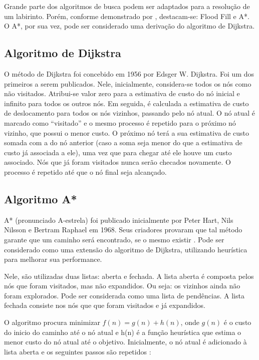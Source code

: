Grande parte dos algoritmos de busca podem ser adaptados para a resolução de um labirinto. Porém, conforme demonstrado por , destacam-se: Flood Fill e A*. O A*, por sua vez, pode ser considerado uma derivação do algoritmo de Dijkstra.

\subsection{Algoritmo de Dijkstra}
\label{ssec:algoritmo_dijkstra}
O método de Dijkstra foi concebido em 1956 por Edsger W. Dijkstra. Foi um dos primeiros a serem publicados. Nele, inicialmente, considera-se todos os nós como não visitados. Atribui-se valor zero para a estimativa de custo do nó inicial e infinito para todos os outros nós. Em seguida, é calculada a estimativa de custo de deslocamento para todos os nós vizinhos, passando pelo nó atual. O nó atual é marcado como “visitado” e o mesmo processo é repetido para o próximo nó vizinho, que possui o menor custo. O próximo nó terá a sua estimativa de custo somada com a do nó anterior (caso a soma seja menor do que a estimativa de custo já associada a ele), uma vez que para chegar até ele houve um custo associado. Nós que já foram visitados nunca serão checados novamente. O processo é repetido até que o nó final seja alcançado.

\subsection{Algoritmo A*}
\label{ssec:aestrela}
A* (pronunciado A-estrela) foi publicado inicialmente por Peter Hart, Nils Nilsson e Bertram Raphael em 1968. Seus criadores provaram que tal método garante que um caminho será encontrado, se o mesmo existir \cite{Hart1968}. Pode ser considerado como uma extensão do algoritmo de Dijkstra, utilizando heurística para melhorar sua performance.

Nele, são utilizadas duas listas: aberta e fechada. A lista aberta é composta pelos nós que foram visitados, mas não expandidos. Ou seja: os vizinhos ainda não foram explorados. Pode ser considerada como uma lista de pendências. A lista fechada consiste nos nós que que foram visitados e já expandidos.

O algoritmo procura minimizar $f(n) = g(n) + h(n)$, onde $g(n)$ é o custo do inicio do caminho até o nó atual e h(n) é a função heurística que estima o menor custo do nó atual até o objetivo. 
Inicialmente, o nó atual é adicionado à lista aberta e os seguintes passos são repetidos \cite{Cui2010}:

